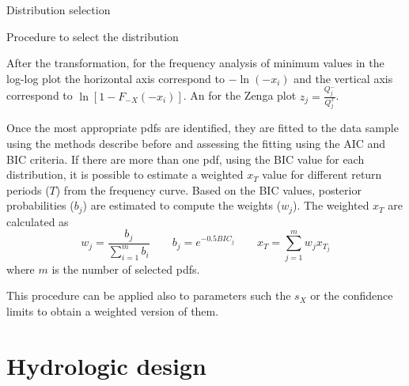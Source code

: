\documentclass[8pt]{beamer}
\renewcommand{\emph}[1]{\textcolor{myorange}{#1}}
\begin{document}
\begin{frame}{Distribution selection}
    \vspace{-3pt}
    \begin{block}{Procedure to select the distribution}
    \end{block}
    After the transformation, for the frequency analysis of \emph{minimum values} in the \emph{log-log plot} the horizontal axis correspond to  $-\ln(-x_i)$ and the vertical axis correspond to $\ln[1 - F_{-X} (-x_i)]$. An for the \emph{Zenga plot} $z_j = \frac{Q_j^-}{Q_j^x}$.  

    Once the most appropriate \emph{pdf}s are identified, they are fitted to the data sample using the methods describe before and assessing the fitting using the \emph{AIC} and \emph{BIC} criteria. If there are more than one \emph{pdf}, using the \emph{BIC} value for each distribution, it is possible to estimate a weighted $x_T$ value for different return periods ($T$) from the \emph{frequency curve}. Based on the \emph{BIC} values, posterior probabilities ($b_j$) are estimated to compute the weights ($w_j$). The weighted $x_T$ are calculated as
    \[
        w_j = \frac{b_j}{\sum_{i=1}^m b_i} \quad \quad b_j = e^{-0.5 BIC_j} \quad \quad x_T = \sum_{j=1}^m w_j x_{T_j}
    \]
    where $m$ is the number of selected \emph{pdf}s. 

    This procedure can be applied also to parameters such the $s_X$ or the \emph{confidence limits} to obtain a weighted version of them. 

\end{frame}

\section{Hydrologic design}
\end{document}
